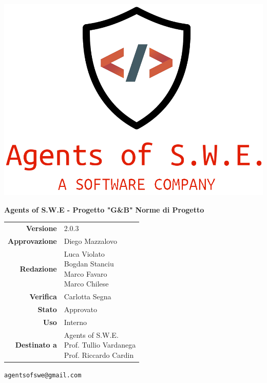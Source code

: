 


\begin{titlepage}
\thispagestyle{empty}

\begin{center}
\includegraphics[scale=0.3]{./images/logo.png} 

\large \textbf{Agents of S.W.E - Progetto "G\&B"}
\vfill
\Huge \textbf{Norme di Progetto}
\vfill
\large
\renewcommand{\arraystretch}{1.3}
\begin{tabular}{r|l}

\textbf{Versione} & 2.0.3\\

\textbf{Approvazione} & Diego Mazzalovo\\
\textbf{Redazione} & \parbox[t]{5cm}{Luca Violato\\Bogdan Stanciu\\Marco Favaro\\Marco Chilese}\\\
\textbf{Verifica} & \parbox[t]{5cm}{Carlotta Segna}\\
\textbf{Stato} & Approvato\\
\textbf{Uso} & Interno\\
\textbf{Destinato a} & \parbox[t]{5cm}{Agents of S.W.E. \\Prof. Tullio Vardanega\\Prof. Riccardo Cardin}
\end{tabular}
\vfill
\small
\texttt{agentsofswe@gmail.com}
\end{center}
\end{titlepage}

